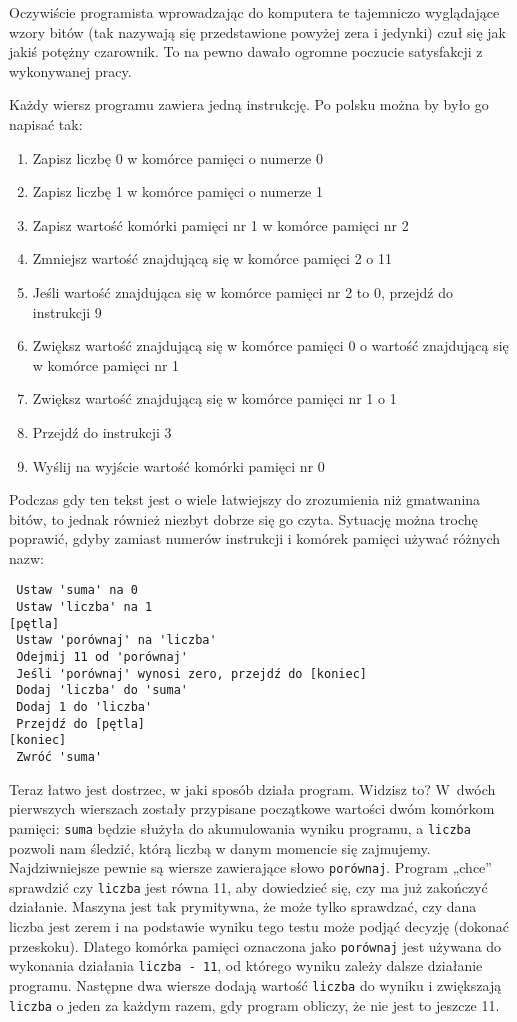   
Oczywiście programista wprowadzając do komputera te tajemniczo wyglądające wzory bitów (tak nazywają się przedstawione powyżej zera i jedynki) czuł się jak jakiś potężny czarownik. To na pewno dawało ogromne poczucie satysfakcji z wykonywanej pracy.

  
Każdy wiersz programu zawiera jedną instrukcję. Po polsku można by było go napisać tak:

  \begin{enumerate}
    \item Zapisz liczbę 0 w komórce pamięci o numerze 0
    \item Zapisz liczbę 1 w komórce pamięci o numerze 1
    \item Zapisz wartość komórki pamięci nr 1 w komórce pamięci nr 2
    \item Zmniejsz wartość znajdującą się w komórce pamięci 2 o 11
    \item Jeśli wartość znajdująca się w komórce pamięci nr 2 to 0, przejdź do instrukcji 9
    \item Zwiększ wartość znajdującą się w komórce pamięci 0 o wartość znajdującą się w komórce pamięci nr 1
    \item Zwiększ wartość znajdującą się w komórce pamięci nr 1 o 1
    \item Przejdź do instrukcji 3
    \item Wyślij na wyjście wartość komórki pamięci nr 0
  \end{enumerate}
  
Podczas gdy ten tekst jest o wiele łatwiejszy do zrozumienia niż gmatwanina bitów, to jednak również niezbyt dobrze się go czyta. Sytuację można trochę poprawić, gdyby zamiast numerów instrukcji i komórek pamięci używać różnych nazw:

  
\begin{verbatim} 
 Ustaw 'suma' na 0
 Ustaw 'liczba' na 1
[pętla]
 Ustaw 'porównaj' na 'liczba'
 Odejmij 11 od 'porównaj'
 Jeśli 'porównaj' wynosi zero, przejdź do [koniec]
 Dodaj 'liczba' do 'suma'
 Dodaj 1 do 'liczba'
 Przejdź do [pętla]
[koniec]
 Zwróć 'suma'
 \end{verbatim}
  
Teraz łatwo jest dostrzec, w jaki sposób działa program. Widzisz to? W~dwóch pierwszych wierszach zostały przypisane początkowe wartości dwóm komórkom pamięci: \texttt{suma} będzie służyła do akumulowania wyniku programu, a \texttt{liczba} pozwoli nam śledzić, którą liczbą w danym momencie się zajmujemy. Najdziwniejsze pewnie są wiersze zawierające słowo \texttt{porównaj}. Program „chce” sprawdzić czy \texttt{liczba} jest równa 11, aby dowiedzieć się, czy ma już zakończyć działanie. Maszyna jest tak prymitywna, że może tylko sprawdzać, czy dana liczba jest zerem i na podstawie wyniku tego testu może podjąć decyzję (dokonać przeskoku). Dlatego komórka pamięci oznaczona jako \texttt{porównaj} jest używana do wykonania działania \texttt{liczba - 11}, od którego wyniku zależy dalsze działanie programu. Następne dwa wiersze dodają wartość \texttt{liczba} do wyniku i zwiększają \texttt{liczba} o jeden za każdym razem, gdy program obliczy, że nie jest to jeszcze 11.

